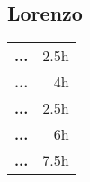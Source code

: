 \subsection*{Lorenzo}
\begin{table}[H]
    \begin{tabular}{lr}
        \toprule
        \textbf{...} & 2.5h \\
        \textbf{...} & 4h   \\
        \textbf{...} & 2.5h \\
        \textbf{...} & 6h   \\
        \textbf{...} & 7.5h \\
        \bottomrule
    \end{tabular}
\end{table}
